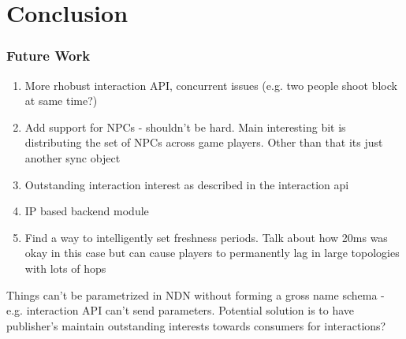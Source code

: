 \chapter{Conclusion}

\subsection{Future Work}\label{sec:conc:fw}
\begin{enumerate}
    \item More rhobust interaction API, concurrent issues (e.g. two people shoot block at same time?)
    \item Add support for NPCs - shouldn't be hard. Main interesting bit is distributing the set of NPCs across game players. Other than that its just another sync object
    \item Outstanding interaction interest as described in the interaction api 
    \item IP based backend module
    \item Find a way to intelligently set freshness periods. Talk about how 20ms was okay in this case but can cause players to permanently lag in large topologies with lots of hops
\end{enumerate}


Things can't be parametrized in NDN without forming a gross name schema - e.g. interaction API can't send parameters. Potential solution is to have publisher's maintain outstanding interests towards consumers for interactions?